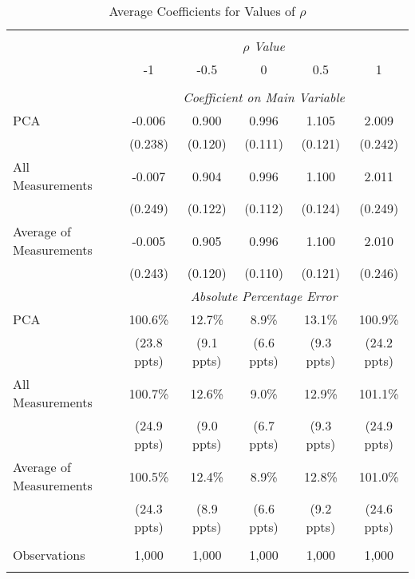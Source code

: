 \begin{table}[!htbp] \centering
  \caption{Average Coefficients for Values of $\rho$ \label{sim_rho_3}}
\begin{tabular}{@{\extracolsep{5pt}}lccccc}
\\[-1.8ex]\hline
\hline \\[-1.8ex]
& \multicolumn{5}{c}{$\rho$ \textit{ Value}} \
\cr 
\\[-1.8ex] & -1 & -0.5 & 0 & 0.5 & 1 \\
\hline \\[-1.8ex]
& \multicolumn{5}{c}{\textit{Coefficient on Main Variable}} \\
 PCA & -0.006 & 0.900 & 0.996 & 1.105 & 2.009  \\
  & (0.238) & (0.120) & (0.111) & (0.121) & (0.242)\\
 All Measurements & -0.007 & 0.904 & 0.996 & 1.100 & 2.011  \\
  & (0.249) & (0.122) & (0.112) & (0.124) & (0.249)\\
 Average of Measurements & -0.005 & 0.905 & 0.996 & 1.100 & 2.010  \\
  & (0.243) & (0.120) & (0.110) & (0.121) & (0.246)\\
& \multicolumn{5}{c}{\textit{Absolute Percentage Error}} \\
  PCA & 100.6\% & 12.7\% & 8.9\% & 13.1\% & 100.9\% \\
   & (23.8 ppts) & (9.1 ppts) & (6.6 ppts) & (9.3 ppts) & (24.2 ppts)\\
All Measurements & 100.7\% & 12.6\% & 9.0\% & 12.9\% & 101.1\%  \\
  & (24.9 ppts) & (9.0 ppts) & (6.7 ppts) & (9.3 ppts) & (24.9 ppts)\\
  Average of Measurements & 100.5\% & 12.4\% & 8.9\% & 12.8\% & 101.0\% \\
  & (24.3 ppts) & (8.9 ppts) & (6.6 ppts) & (9.2 ppts) & (24.6 ppts)\\
  \hline \\[-1.8ex]
 Observations & 1,000 & 1,000 & 1,000 & 1,000 & 1,000\\
\hline
\hline \\[-1.8ex]
\end{tabular}
\end{table}